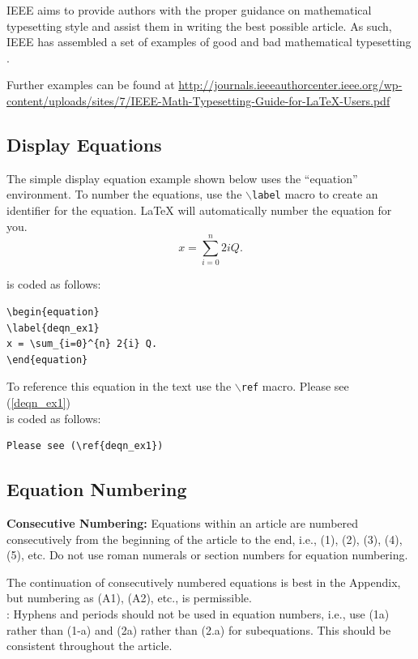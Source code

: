 \documentclass[lettersize,journal]{IEEEtran}
\begin{document}
IEEE aims to provide authors with the proper guidance on mathematical typesetting style and assist them in writing the best possible article. As such, IEEE has assembled a set of examples of good and bad mathematical typesetting \cite{ref1,ref2,ref3,ref4,ref5}. 

Further examples can be found at \url{http://journals.ieeeauthorcenter.ieee.org/wp-content/uploads/sites/7/IEEE-Math-Typesetting-Guide-for-LaTeX-Users.pdf}

\subsection{Display Equations}
The simple display equation example shown below uses the ``equation'' environment. To number the equations, use the $\backslash${\tt{label}} macro to create an identifier for the equation. LaTeX will automatically number the equation for you.
\begin{equation}
\label{deqn_ex1}
x = \sum_{i=0}^{n} 2{i} Q.
\end{equation}

\noindent is coded as follows:
\begin{verbatim}
\begin{equation}
\label{deqn_ex1}
x = \sum_{i=0}^{n} 2{i} Q.
\end{equation}
\end{verbatim}

To reference this equation in the text use the $\backslash${\tt{ref}} macro. 
Please see (\ref{deqn_ex1})\\
\noindent is coded as follows:
\begin{verbatim}
Please see (\ref{deqn_ex1})\end{verbatim}

\subsection{Equation Numbering}
{\bf{Consecutive Numbering:}} Equations within an article are numbered consecutively from the beginning of the
article to the end, i.e., (1), (2), (3), (4), (5), etc. Do not use roman numerals or section numbers for equation numbering.

 The continuation of consecutively numbered equations is best in the Appendix, but numbering
 as (A1), (A2), etc., is permissible.\\

: Hyphens and periods should not be used in equation numbers, i.e., use (1a) rather than
(1-a) and (2a) rather than (2.a) for subequations. This should be consistent throughout the article.
\end{document}
